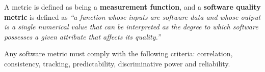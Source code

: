 \par A metric is defined as being a {\bf measurement function}, and a {\bf software quality metric} is defined as \emph{``a function whose inputs are software data and whose output is a single numerical value that can be interpreted as the degree to which software possesses a given attribute that affects its quality.''}

\par Any software metric must comply with the following criteria: correlation, consistency, tracking, predictability, discriminative power and reliability.